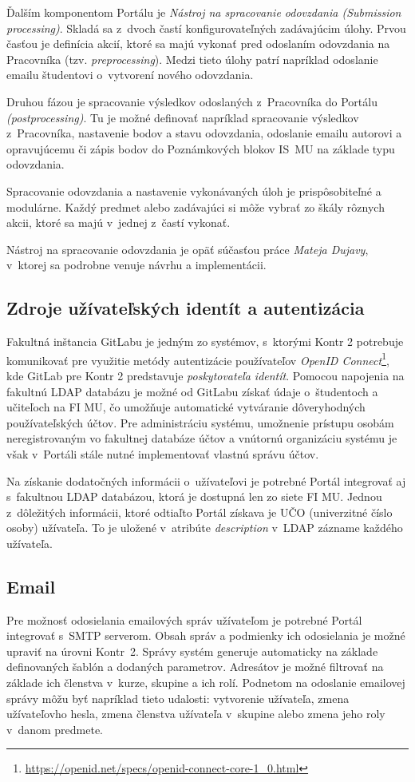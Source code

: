 \documentclass[
  digital, %
  oneside, %
  table,   %
  lof,     %
  lot,   %
]{fithesis3}
\begin{document}
Ďalším komponentom Portálu je \emph{Nástroj na spracovanie odovzdania (Submission processing)}. Skladá sa z~dvoch častí konfigurovateľných zadávajúcim úlohy. Prvou časťou je definícia akcií, ktoré sa majú vykonať pred odoslaním odovzdania na Pracovníka (tzv. \emph{preprocessing}). Medzi tieto úlohy patrí napríklad odoslanie emailu študentovi o~vytvorení nového odovzdania.

Druhou fázou je spracovanie výsledkov odoslaných z~Pracovníka do Portálu \emph{(postprocessing)}. Tu je možné definovať napríklad spracovanie výsledkov z~Pracovníka, nastavenie bodov a stavu odovzdania, odoslanie emailu autorovi a opravujúcemu či zápis bodov do Poznámkových blokov IS~MU na základe typu odovzdania. 

Spracovanie odovzdania a nastavenie vykonávaných úloh je prispôsobiteľné a modulárne. Každý predmet alebo zadávajúci si môže vybrať zo škály rôznych akcii, ktoré sa majú v~jednej z~častí vykonať.

Nástroj na spracovanie odovzdania je opäť súčasťou práce \emph{Mateja Dujavy}\cite{kontr-scheduler}, v~ktorej sa podrobne venuje návrhu a implementácii.

\subsection{Zdroje užívateľských identít a autentizácia}

Fakultná inštancia GitLabu je jedným zo systémov, s~ktorými Kontr 2 potrebuje komunikovať pre využitie metódy autentizácie používateľov \emph{OpenID Connect}\footnote{\url{https://openid.net/specs/openid-connect-core-1_0.html}}, kde GitLab pre Kontr 2 predstavuje \emph{poskytovateľa identít}. Pomocou napojenia na fakultnú LDAP databázu je možné od GitLabu získať údaje o~študentoch a učiteľoch na FI MU, čo umožňuje automatické vytváranie dôveryhodných používateľských účtov. Pre administráciu systému, umožnenie prístupu osobám neregistrovaným vo fakultnej databáze účtov a vnútornú organizáciu systému je však v~Portáli stále nutné implementovať vlastnú správu účtov. 

Na získanie dodatočných informácii o~užívateľovi je potrebné Portál integrovať aj s~fakultnou LDAP databázou, ktorá je dostupná len zo siete FI MU. Jednou z~dôležitých informácii, ktoré odtiaľto Portál získava je UČO (univerzitné číslo osoby) užívateľa. To je uložené v~atribúte \emph{description} v~LDAP zázname každého užívateľa.

\subsection{Email}
Pre možnosť odosielania emailových správ užívateľom je potrebné Portál integrovať s~SMTP serverom. Obsah správ a podmienky ich odosielania je možné upraviť na úrovni Kontr~2. Správy systém generuje automaticky na základe definovaných šablón a dodaných parametrov. Adresátov je možné filtrovať na základe ich členstva v~kurze, skupine a ich rolí. Podnetom na odoslanie emailovej správy môžu byť napríklad tieto udalosti: vytvorenie užívateľa, zmena užívateľovho hesla, zmena členstva užívateľa v~skupine alebo zmena jeho roly v~danom predmete.
\end{document}
